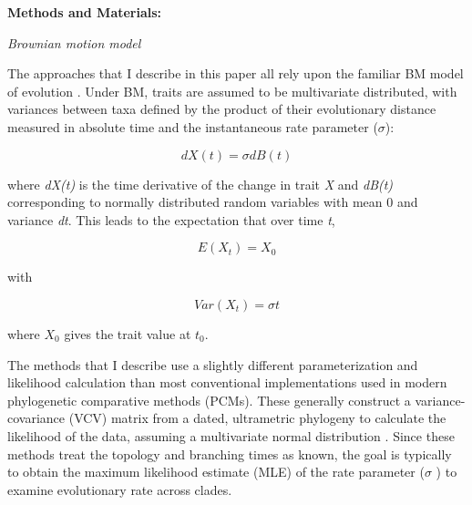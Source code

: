 \documentclass[12pt]{article}
\begin{document}
\noindent\textbf{Methods and Materials:}

\noindent\emph{Brownian motion model}

The approaches that I describe in this paper all rely upon the familiar
BM model of evolution \citep{butler2004phylogenetic,o2006testing} . Under BM, traits are assumed to be multivariate
distributed, with variances between taxa defined by the product of their
evolutionary distance measured in absolute time and the instantaneous
rate parameter ($\sigma$):

\begin{equation}
 dX(t) = \sigma dB(t)
\end{equation}

where \emph{dX(t)} is the time derivative of the change in trait
\emph{X} and \emph{dB(t)} corresponding to normally distributed random
variables with mean 0 and variance \emph{dt}. This leads to the
expectation that over time \emph{t},

\begin{equation}
 E(X_t) = X_0 
\end{equation}

with

\begin{equation}
Var(X_t) =  \sigma t
\end{equation}


where $X_0$ gives the trait value at $t_0$.

The methods that I describe use a slightly different parameterization
and likelihood calculation than most conventional implementations used
in modern phylogenetic comparative methods (PCMs). These generally
construct a variance-covariance (VCV) matrix from a dated, ultrametric
phylogeny to calculate the likelihood of the data, assuming a
multivariate normal distribution \citep{butler2004phylogenetic,o2006testing}. Since these methods treat the topology and
branching times as known, the goal is typically to obtain the maximum
likelihood estimate (MLE) of the rate parameter ($\sigma$ ) to examine
evolutionary rate across clades.
\end{document}
